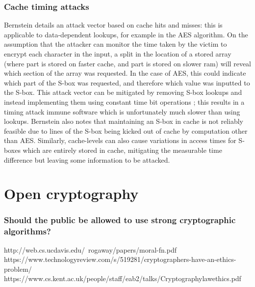\documentclass[british,11pt,a4paper]{article}
\begin{document}
\subsubsection{Cache timing attacks}
Bernstein \cite{Bernstein05cache-timingattacks} details an attack vector based on cache hits and misses:
this is applicable to data-dependent lookups, for example in the AES algorithm.
On the assumption that the attacker can monitor the time taken by the victim to encrypt each character in the input,
a split in the location of a stored array (where part is stored on faster cache, and part is stored on slower ram) will reveal
which section of the array was requested. In the case of AES, this could indicate which part of the S-box was requested, and therefore
which value was inputted to the S-box. This attack vector can be mitigated by removing S-box lookups and instead implementing them using
constant time bit operations \cite{Bernstein05cache-timingattacks}; this results in a timing attack immune software which is unfortunately much slower than using lookups.
Bernstein also notes that maintaining an S-box in cache is not reliably feasible due to lines of the S-box being kicked out of cache by
computation other than AES. Similarly, cache-levels can also cause variations in access times for S-boxes which are entirely stored in cache,
mitigating the measurable time difference but leaving some information to be attacked.





\clearpage
\section{Open cryptography}
\subsubsection{Should the public be allowed to use strong cryptographic algorithms?}
http://web.cs.ucdavis.edu/~rogaway/papers/moral-fn.pdf
https://www.technologyreview.com/s/519281/cryptographers-have-an-ethics-problem/
https://www.cs.kent.ac.uk/people/staff/eab2/talks/Cryptographylawethics.pdf
\end{document}
